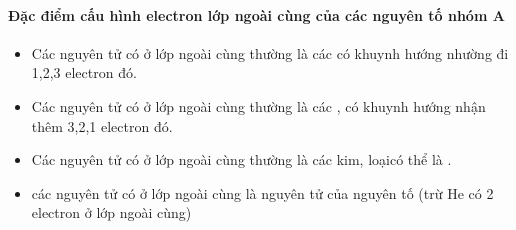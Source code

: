 \paragraph{Đặc điểm cấu hình electron lớp ngoài cùng của các nguyên tố nhóm A}

\begin{hoplythuyet}
	\begin{itemize}
		\item Các nguyên tử có  ở lớp ngoài cùng thường là các  có khuynh hướng nhường đi 1,2,3 electron đó.
		\item Các nguyên tử có  ở lớp ngoài cùng thường là các , có khuynh hướng nhận thêm 3,2,1 electron đó.
		\item Các nguyên tử có   ở lớp ngoài cùng thường là các kim, loạicó thể là .
		\item các nguyên tử có  ở lớp ngoài cùng là nguyên tử của nguyên tố  (trừ He có 2 electron ở lớp ngoài cùng) 
	\end{itemize}
\end{hoplythuyet}

